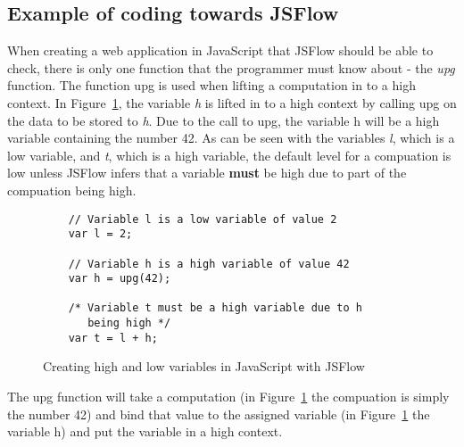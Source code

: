\subsection{Example of coding towards JSFlow}
When creating a web application in JavaScript that JSFlow should be able to check, there is only one function that the programmer must know about - the \emph{upg} function. The function upg is used when lifting a computation in to a high context. In Figure~\ref{fig:upg}, the variable \emph{h} is lifted in to a high context by calling upg on the data to be stored to \emph{h}. Due to the call to upg, the variable h will be a high variable containing the number 42. As can be seen with the variables \emph{l}, which is a low variable, and \emph{t}, which is a high variable, the default level for a compuation is low unless JSFlow infers that a variable \textbf{must} be high due to part of the compuation being high.

\begin{figure}[h]
  \begin{verbatim}
    // Variable l is a low variable of value 2
    var l = 2;

    // Variable h is a high variable of value 42
    var h = upg(42);

    /* Variable t must be a high variable due to h
       being high */
    var t = l + h;
  \end{verbatim}
  \caption{Creating high and low variables in JavaScript with JSFlow}
  \label{fig:upg}
\end{figure}
The upg function will take a computation (in Figure~\ref{fig:upg} the compuation is simply the number 42) and bind that value to the assigned variable (in Figure~\ref{fig:upg} the variable h) and put the variable in a high context.

